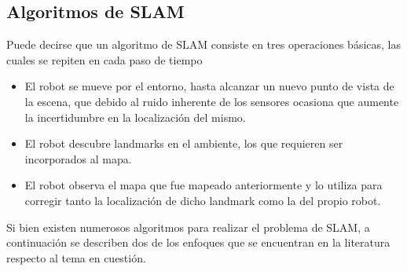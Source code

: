 

\ifimagenes
\else
\subsection{Algoritmos de SLAM}
Puede decirse que un algoritmo de SLAM consiste en tres operaciones básicas, las cuales se repiten en cada paso de tiempo
\begin{itemize}
    \item El robot se mueve por el entorno, hasta alcanzar un nuevo punto de vista de la escena, que debido al ruido inherente de los sensores ocasiona que aumente la incertidumbre en la localización del mismo.
    \item El robot descubre landmarks en el ambiente, los que requieren ser incorporados al mapa.
    \item El robot observa el mapa que fue mapeado anteriormente y lo utiliza para corregir tanto la localización de dicho landmark como la del propio robot.
\end{itemize}

Si bien existen numerosos algoritmos para realizar el problema de SLAM, a continuación se describen dos de los enfoques que se encuentran en la literatura respecto al tema en cuestión.

